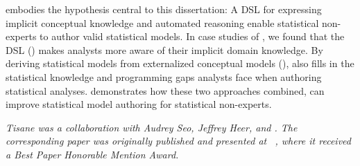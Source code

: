 \tisane embodies the hypothesis central to this dissertation: A DSL for
expressing implicit conceptual knowledge and automated reasoning enable
statistical non-experts to author valid statistical models. In case studies of
\tisane, we found that the DSL (\thesisChallengeExplicit) makes analysts more aware of
their implicit domain knowledge. By deriving statistical models from
externalized conceptual models (\thesisChallengeRep), \tisane also fills in the
statistical knowledge and programming gaps analysts face when authoring
statistical analyses. \tisane demonstrates how these two approaches combined,
can improve statistical model authoring for statistical non-experts. 







\textit{Tisane was a collaboration with Audrey Seo, Jeffrey
Heer, and \reneJust. The corresponding paper was originally published and presented at
~\cite{jun2022tisane}, where it received a \textit{Best Paper Honorable
Mention Award}.}
